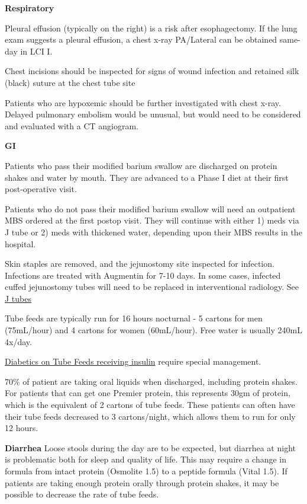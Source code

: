 \documentclass[
  letterpaper,
]{scrbook}
\begin{document}
\textbf{Respiratory}

Pleural effusion (typically on the right) is a risk after esophagectomy.
If the lung exam suggests a pleural effusion, a chest x-ray PA/Lateral
can be obtained same-day in LCI I.

Chest incisions should be inspected for signs of wound infection and
retained silk (black) suture at the chest tube site

Patients who are hypoxemic should be further investigated with chest
x-ray. Delayed pulmonary embolism would be unusual, but would need to be
considered and evaluated with a CT angiogram.

\textbf{GI}

Patients who pass their modified barium swallow are discharged on
protein shakes and water by mouth. They are advanced to a Phase I diet
at their first post-operative visit.

Patients who do not pass their modified barium swallow will need an
outpatient MBS ordered at the first postop visit. They will continue
with either 1) meds via J tube or 2) meds with thickened water,
depending upon their MBS results in the hospital.

Skin staples are removed, and the jejunostomy site inspected for
infection. Infections are treated with Augmentin for 7-10 days. In some
cases, infected cuffed jejunostomy tubes will need to be replaced in
interventional radiology. See \href{31-outpt_jejunostomy.htm}{J tubes}

Tube feeds are typically run for 16 hours nocturnal - 5 cartons for men
(75mL/hour) and 4 cartons for women (60mL/hour). Free water is usually
240mL 4x/day.

\hyperref[outpt_tubefeeds_diabetes]{Diabetics on Tube Feeds receiving
insulin} require special management.

70\% of patient are taking oral liquids when discharged, including
protein shakes. For patients that can get one Premier protein, this
represents 30gm of protein, which is the equivalent of 2 cartons of tube
feeds. These patients can often have their tube feeds decreased to 3
cartons/night, which allows them to run for only 12 hours.

\textbf{Diarrhea} Loose stools during the day are to be expected, but
diarrhea at night is problematic both for sleep and quality of life.
This may require a change in formula from intact protein (Osmolite 1.5)
to a peptide formula (Vital 1.5). If patients are taking enough protein
orally through protein shakes, it may be possible to decrease the rate
of tube feeds.
\end{document}
